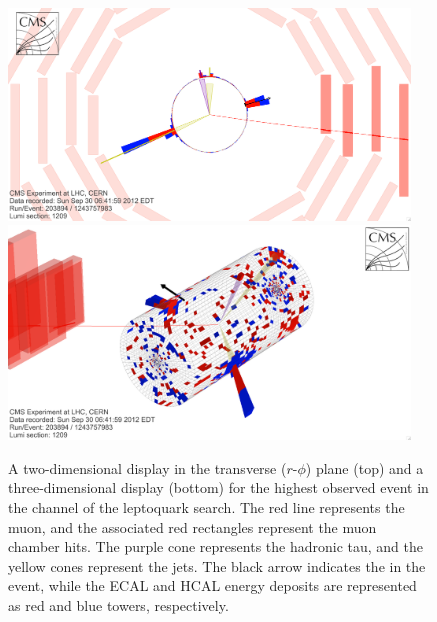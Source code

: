 \begin{figure}[hbtp]
\begin{center}
\includegraphics[width=0.95\textwidth]{figures/eventdisplays/LQ_evt1_rphi.png}
\includegraphics[width=0.95\textwidth]{figures/eventdisplays/LQ_evt1_3D.png}
\caption{A two-dimensional display in the transverse ($r$-$\phi$) plane (top) and a three-dimensional display (bottom) for the highest \ST observed event in the \mutau channel of the leptoquark search. The red line represents the muon, and the associated red rectangles represent the muon chamber hits. The purple cone represents the hadronic tau, and the yellow cones represent the jets. The black arrow indicates the \met in the event, while the ECAL and HCAL energy deposits are represented as red and blue towers, respectively. }
\label{fig:lq-evt1}
\end{center}
\end{figure}

